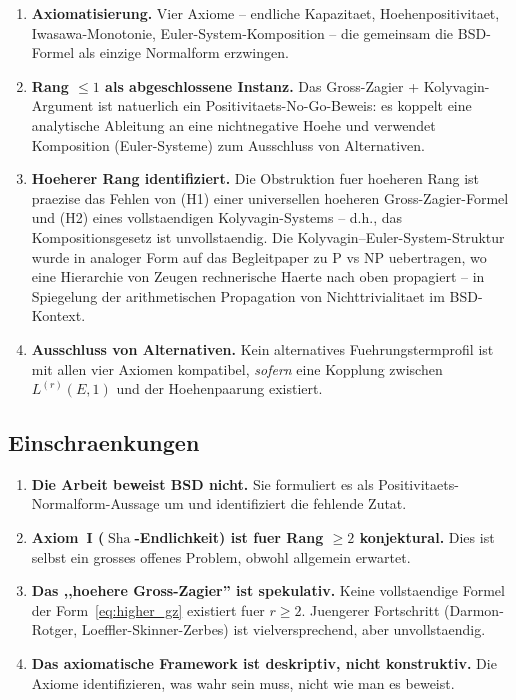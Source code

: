 \documentclass[aps,prd,twocolumn,superscriptaddress,nofootinbib]{revtex4-2}
\theoremstyle{definition}
\theoremstyle{remark}
\DeclareMathOperator{\Sha}{Sha}
\begin{document}
\begin{enumerate}
\item \textbf{Axiomatisierung.} Vier Axiome -- endliche Kapazitaet, Hoehenpositivitaet, Iwasawa-Monotonie, Euler-System-Komposition -- die gemeinsam die BSD-Formel als einzige Normalform erzwingen.

\item \textbf{Rang $\leq 1$ als abgeschlossene Instanz.} Das Gross-Zagier + Kolyvagin-Argument ist natuerlich ein Positivitaets-No-Go-Beweis: es koppelt eine analytische Ableitung an eine nichtnegative Hoehe und verwendet Komposition (Euler-Systeme) zum Ausschluss von Alternativen.

\item \textbf{Hoeherer Rang identifiziert.} Die Obstruktion fuer hoeheren Rang ist praezise das Fehlen von (H1) einer universellen hoeheren Gross-Zagier-Formel und (H2) eines vollstaendigen Kolyvagin-Systems -- d.h., das Kompositionsgesetz ist unvollstaendig. Die Kolyvagin--Euler-System-Struktur wurde in analoger Form auf das Begleitpaper zu P vs NP uebertragen, wo eine Hierarchie von Zeugen rechnerische Haerte nach oben propagiert -- in Spiegelung der arithmetischen Propagation von Nichttrivialitaet im BSD-Kontext.

\item \textbf{Ausschluss von Alternativen.} Kein alternatives Fuehrungstermprofil ist mit allen vier Axiomen kompatibel, \textit{sofern} eine Kopplung zwischen $L^{(r)}(E,1)$ und der Hoehenpaarung existiert.
\end{enumerate}

\subsection{Einschraenkungen}

\begin{enumerate}
\item \textbf{Die Arbeit beweist BSD nicht.} Sie formuliert es als Positivitaets-Normalform-Aussage um und identifiziert die fehlende Zutat.

\item \textbf{Axiom~I ($\Sha$-Endlichkeit) ist fuer Rang $\geq 2$ konjektural.} Dies ist selbst ein grosses offenes Problem, obwohl allgemein erwartet.

\item \textbf{Das ,,hoehere Gross-Zagier'' ist spekulativ.} Keine vollstaendige Formel der Form~\eqref{eq:higher_gz} existiert fuer $r \geq 2$. Juengerer Fortschritt (Darmon-Rotger, Loeffler-Skinner-Zerbes) ist vielversprechend, aber unvollstaendig.

\item \textbf{Das axiomatische Framework ist deskriptiv, nicht konstruktiv.} Die Axiome identifizieren, was wahr sein muss, nicht wie man es beweist.
\end{enumerate}
\end{document}
